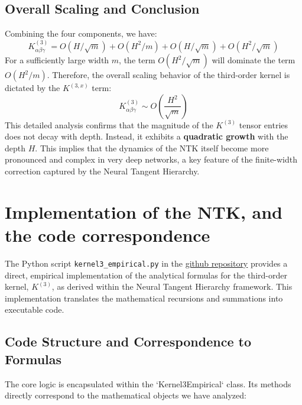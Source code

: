 \documentclass[a4paper]{article}
\begin{document}
\subsection{Overall Scaling and Conclusion}
Combining the four components, we have:
\[
K^{(3)}_{\alpha\beta\gamma} = O(H/\sqrt{m}) + O(H^2/m) + O(H/\sqrt{m}) + O(H^2/\sqrt{m})
\]
For a sufficiently large width $m$, the term $O(H^2/\sqrt{m})$ will dominate the term $O(H^2/m)$. Therefore, the overall scaling behavior of the third-order kernel is dictated by the $K^{(3,x)}$ term:
\begin{equation}
    K^{(3)}_{\alpha\beta\gamma} \sim O\left(\frac{H^2}{\sqrt{m}}\right)
\end{equation}
This detailed analysis confirms that the magnitude of the $K^{(3)}$ tensor entries does not decay with depth. Instead, it exhibits a \textbf{quadratic growth} with the depth $H$. This implies that the dynamics of the NTK itself become more pronounced and complex in very deep networks, a key feature of the finite-width correction captured by the Neural Tangent Hierarchy.

\newpage

\section{Implementation of the NTK, and the code correspondence}

The Python script \texttt{kernel3\_empirical.py} in the \href{https://github.com/janisaiad/DeNN-NTK}{github repository} provides a direct, empirical implementation of the analytical formulas for the third-order kernel, $K^{(3)}$, as derived within the Neural Tangent Hierarchy framework. This implementation translates the mathematical recursions and summations into executable code.

\subsection{Code Structure and Correspondence to Formulas}
The core logic is encapsulated within the `Kernel3Empirical` class. Its methods directly correspond to the mathematical objects we have analyzed:
\end{document}
